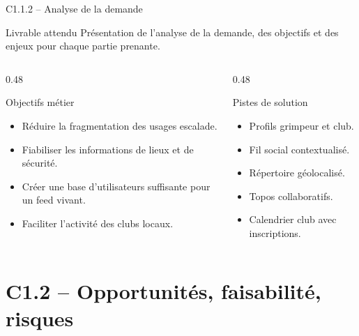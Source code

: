 \documentclass[aspectratio=169,11pt]{beamer}
\newcommand{\competence}[2]{%
  \begin{block}{#1}
    #2
  \end{block}
}
\begin{document}
\begin{frame}{C1.1.2 -- Analyse de la demande}
  \competence{Livrable attendu}{Présentation de l'analyse de la demande, des objectifs et des enjeux pour chaque partie prenante.}
  \begin{columns}[T]
    \begin{column}{0.48\textwidth}
      \begin{block}{Objectifs métier}
        \begin{itemize}
          \item Réduire la fragmentation des usages escalade.
          \item Fiabiliser les informations de lieux et de sécurité.
          \item Créer une base d'utilisateurs suffisante pour un feed vivant.
          \item Faciliter l'activité des clubs locaux.
        \end{itemize}
      \end{block}
    \end{column}
    \begin{column}{0.48\textwidth}
      \begin{block}{Pistes de solution}
        \begin{itemize}
          \item Profils grimpeur et club.
          \item Fil social contextualisé.
          \item Répertoire géolocalisé.
          \item Topos collaboratifs.
          \item Calendrier club avec inscriptions.
        \end{itemize}
      \end{block}
    \end{column}
  \end{columns}
\end{frame}

\section{C1.2 -- Opportunités, faisabilité, risques}
\end{document}
